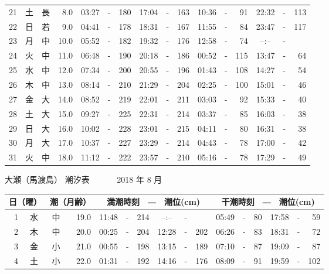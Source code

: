 \documentclass[12pt.a4j]{jsarticle}
\begin{document}
\begin{center}
\begin{table}[ht]
\begin{tabular}{|rc|cr|ccrccr|ccrccr|}
21 & 土 & 長 &  8.0 &  03:27 &-& 180  &  17:04 &-& 163  &   10:36 &-&  91  &   22:32 &-& 113  \\
22 & 日 & 若 &  9.0 &  04:41 &-& 178  &  18:31 &-& 167  &   11:55 &-&  84  &   23:47 &-& 117  \\
23 & 月 & 中 & 10.0 &  05:52 &-& 182  &  19:32 &-& 176  &   12:58 &-&  74  &   --:-- &-&     \\
24 & 火 & 中 & 11.0 &  06:48 &-& 190  &  20:18 &-& 186  &   00:52 &-& 115  &   13:47 &-&  64  \\
25 & 水 & 中 & 12.0 &  07:34 &-& 200  &  20:55 &-& 196  &   01:43 &-& 108  &   14:27 &-&  54  \\
26 & 木 & 中 & 13.0 &  08:14 &-& 210  &  21:29 &-& 204  &   02:25 &-& 100  &   15:01 &-&  46  \\
27 & 金 & 大 & 14.0 &  08:52 &-& 219  &  22:01 &-& 211  &   03:03 &-&  92  &   15:33 &-&  40  \\
28 & 土 & 大 & 15.0 &  09:27 &-& 225  &  22:31 &-& 214  &   03:37 &-&  85  &   16:03 &-&  38  \\
29 & 日 & 大 & 16.0 &  10:02 &-& 228  &  23:01 &-& 215  &   04:11 &-&  80  &   16:31 &-&  38  \\
30 & 月 & 大 & 17.0 &  10:37 &-& 227  &  23:29 &-& 214  &   04:43 &-&  78  &   17:00 &-&  42  \\
31 & 火 & 中 & 18.0 &  11:12 &-& 222  &  23:57 &-& 210  &   05:16 &-&  78  &   17:29 &-&  49  \\
   \hline
   \end{tabular}
\end{table}
\newpage
 {\LARGE 大瀬（馬渡島）  潮汐表　　　}
 {\large 2018 年  8 月}\\
 \begin{table}[ht]
    \begin{tabular}{|rc|cr|ccrccr|ccrccr|}
    \hline
    \multicolumn{2}{|c|}{日（曜）} & \multicolumn{2}{c|}{潮（月齢）} & \multicolumn{6}{c|}{満潮時刻　―　潮位(cm)} & \multicolumn{6}{c|}{干潮時刻　―　潮位(cm)} \\
 \hline
 1 & 水 & 中 & 19.0 &  11:48 &-& 214  &  --:-- &-&     &   05:49 &-&  80  &   17:58 &-&  59  \\
 2 & 木 & 中 & 20.0 &  00:25 &-& 204  &  12:28 &-& 202  &   06:26 &-&  83  &   18:31 &-&  72  \\
 3 & 金 & 小 & 21.0 &  00:55 &-& 198  &  13:15 &-& 189  &   07:10 &-&  87  &   19:09 &-&  87  \\
 4 & 土 & 小 & 22.0 &  01:31 &-& 192  &  14:16 &-& 176  &   08:09 &-&  91  &   19:59 &-& 102  \\

\end{tabular}
\end{table}
\end{center}
\end{document}
